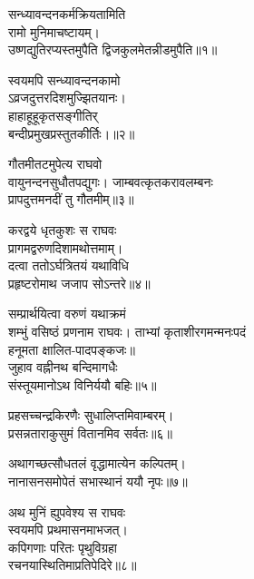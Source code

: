 

\storymeta

\begin{flushleft}
    

सन्ध्यावन्दनकर्मक्रियतामिति\\
रामो मुनिमाचष्टायम्।\\
उष्णद्युतिरप्यस्तमुपैति
द्विजकुलमेतन्नीडमुपैति॥१॥

स्वयमपि सन्ध्यावन्दनकामो\\
ऽव्रजदुत्तरदिशमुज्झितयानः।\\
हाहाहूहूकृतसङ्गीतिर्\\
बन्दीप्रमुखप्रस्तुतकीर्तिः।॥२॥

गौतमीतटमुपेत्य राघवो\\
वायुनन्दनसुधौतपद्युगः।
जाम्बवत्कृतकरावलम्बनः\\
प्रापदुत्तमनदीं तु गौतमीम्॥३॥

करद्वये धृतकुशः स राघवः\\
प्रागमद्वरुणदिशामथोत्तमाम्।\\
दत्वा ततोऽर्घत्रितयं यथाविधि\\
प्रहृष्टरोमाथ जजाप सोऽन्तरे॥४॥

सम्प्रार्थयित्वा वरुणं यथाक्रमं\\
शम्भुं वसिष्ठं प्रणनाम राघवः।
ताभ्यां कृताशीरगमन्मनःपदं\\
हनूमता क्षालित-पादपङ्कजः॥\\
जुहाव वह्नीनथ बन्दिमागधैः\\
संस्तूयमानोऽथ विनिर्ययौ बहिः॥५॥

प्रहसच्चन्द्रकिरणैः सुधालिप्तमिवाम्बरम्।\\
प्रसन्नताराकुसुमं वितानमिव सर्वतः॥६॥

अथागच्छत्सौधतलं वृद्धामात्येन कल्पितम्।\\
नानासनसमोपेतं सभास्थानं ययौ नृपः॥७॥

अथ मुनिं ह्युपवेश्य स राघवः\\
स्वयमपि प्रथमासनमाभजत्।\\
कपिगणाः परितः पृथुविग्रहा\\
रचनयास्थितिमाप्रतिपेदिरे॥८॥


\end{flushleft}
